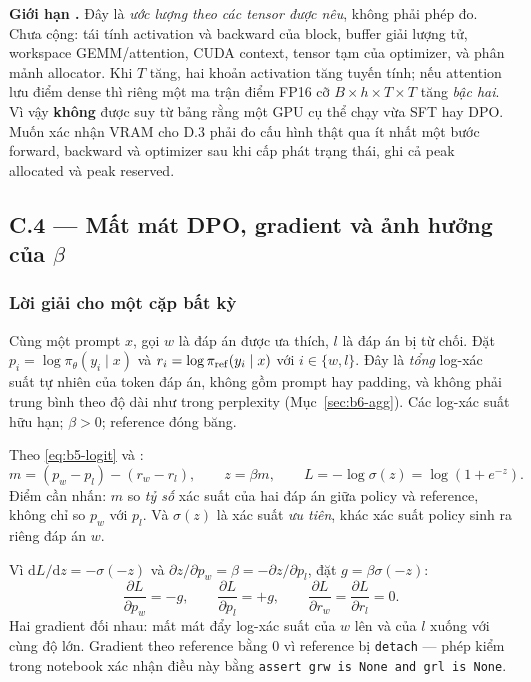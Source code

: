 \textbf{Giới hạn \chualam.} Đây là \emph{ước lượng theo các tensor được nêu}, không
phải phép đo. Chưa cộng: tái tính activation và backward của block, buffer giải
lượng tử, workspace GEMM/attention, CUDA context, tensor tạm của optimizer, và phân
mảnh allocator. Khi $T$ tăng, hai khoản activation tăng tuyến tính; nếu attention
lưu điểm dense thì riêng một ma trận điểm FP16 cỡ $B\times h\times T\times T$ tăng
\emph{bậc hai}. Vì vậy \textbf{không} được suy từ bảng rằng một GPU cụ thể chạy vừa
SFT hay DPO. Muốn xác nhận VRAM cho D.3 phải đo cấu hình thật qua ít nhất một bước
forward, backward và optimizer sau khi cấp phát trạng thái, ghi cả peak allocated
và peak reserved.

\subsection{C.4 --- Mất mát DPO, gradient và ảnh hưởng của $\beta$}
\label{sec:c4}

\subsubsection{Lời giải cho một cặp bất kỳ}

Cùng một prompt $x$, gọi $w$ là đáp án được ưa thích, $l$ là đáp án bị từ chối.
Đặt $p_i=\log\pi_\theta(y_i\mid x)$ và $r_i=\log\pi_{\mathrm{ref}}(y_i\mid x)$ với
$i\in\{w,l\}$. Đây là \emph{tổng} log-xác suất tự nhiên của token đáp án, không gồm
prompt hay padding, và không phải trung bình theo độ dài như trong perplexity
(Mục~\ref{sec:b6-agg}). Các log-xác suất hữu hạn; $\beta>0$; reference đóng băng.

Theo \eqref{eq:b5-logit} và \cite[§4, Eq. (7)]{dpo}:
\begin{equation}
  m=(p_w-p_l)-(r_w-r_l),\qquad z=\beta m,\qquad
  L=-\log\sigma(z)=\log(1+e^{-z}).
  \label{eq:c4-loss}
\end{equation}
Điểm cần nhấn: $m$ so \emph{tỷ số} xác suất của hai đáp án giữa policy và
reference, không chỉ so $p_w$ với $p_l$. Và $\sigma(z)$ là xác suất \emph{ưu tiên},
khác xác suất policy sinh ra riêng đáp án $w$.

Vì $\mathrm dL/\mathrm dz=-\sigma(-z)$ và
$\partial z/\partial p_w=\beta=-\partial z/\partial p_l$, đặt $g=\beta\sigma(-z)$:
\begin{equation}
  \frac{\partial L}{\partial p_w}=-g,\qquad
  \frac{\partial L}{\partial p_l}=+g,\qquad
  \frac{\partial L}{\partial r_w}=\frac{\partial L}{\partial r_l}=0 .
  \label{eq:c4-grad}
\end{equation}
Hai gradient đối nhau: mất mát đẩy log-xác suất của $w$ lên và của $l$ xuống với
cùng độ lớn. Gradient theo reference bằng $0$ vì reference bị
\texttt{detach} --- phép kiểm trong notebook xác nhận điều này bằng
\texttt{assert grw is None and grl is None}.

